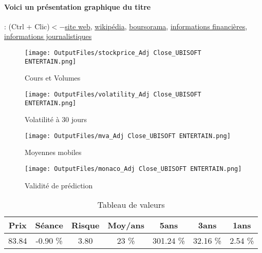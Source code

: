 \documentclass[11pt,a4paper]{report}%
\begin{document}
\paragraph{Voici un présentation graphique du titre} : (Ctrl + Clic)$<-$\href{https://www.ubisoft.com/fr-FR/groupe/espace_investisseurs/index.aspx}{site web}, \href{https://fr.wikipedia.org/wiki/Ubisoft}{wikipédia}, \href{https://www.boursorama.com/cours/1rPUBI}{boursorama}, \href{https://www.qwant.com/?q=site:https:%2f%2fwww.easybourse.com%2faction-societe%2fUBISOFT-ENTERTAIN&t=web&client=ext-firefox-hp}{informations financières}, \href{https://bourse.lerevenu.com/cours-de-bourse/fiche-valeur-synthese/UBISOFT-ENTERTAIN/UBI-FR}{informations journalistiques}
\begin{figure}[!htb]
   \begin{minipage}{0.5\textwidth}
     \centering
     \texttt{[image: OutputFiles/stockprice\_Adj Close\_UBISOFT ENTERTAIN.png]}
     \caption{Cours et Volumes}\label{Fig:price_UBISOFT ENTERTAIN}
   \end{minipage}\hfill
   \begin{minipage}{0.5\textwidth}
     \centering
     \texttt{[image: OutputFiles/volatility\_Adj Close\_UBISOFT ENTERTAIN.png]}
     \caption{Volatilité à 30 jours}\label{Fig:volat_UBISOFT ENTERTAIN}
   \end{minipage}
\end{figure}
\begin{figure}[!htb]
   \begin{minipage}{0.5\textwidth}
     \centering
     \texttt{[image: OutputFiles/mva\_Adj Close\_UBISOFT ENTERTAIN.png]}
     \caption{Moyennes mobiles}\label{Fig:mva_UBISOFT ENTERTAIN}
   \end{minipage}\hfill
   \begin{minipage}{0.5\textwidth}
     \centering
     \texttt{[image: OutputFiles/monaco\_Adj Close\_UBISOFT ENTERTAIN.png]}
     \caption{Validité de prédiction}\label{Fig:prediction_UBISOFT ENTERTAIN}
   \end{minipage}
\end{figure}

\begin{table}[H]
  \centering
    \begin{tabular}{|c|c|c|c|c|c|c|}
    \hline
    Prix & Séance & Risque  & Moy/ans & 5ans & 3ans & 1ans \\
    \hline
    83.84 &    -0.90 \%    & 3.80 & 23 \% & 301.24 \% & 32.16 \% & 2.54 \% \\
    \hline
    \end{tabular}%
        \label{tab:table_UBISOFT ENTERTAIN}%
      \caption{Tableau de valeurs}
\end{table}%
\end{document}
